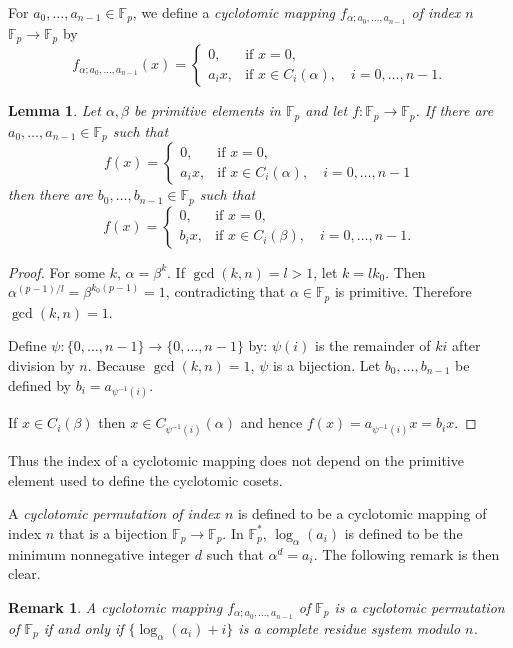 \documentclass[10pt]{amsart}
\newtheorem{remark}[theorem]{Remark}
\newtheorem{lemma}[theorem]{Lemma}
\begin{document}
For $a_0,\ldots,a_{n-1} \in \mathbb{F}_p$, we define a {\em
cyclotomic mapping $f_{\alpha;a_0,\ldots,a_{n-1}}$ of index $n$}
$\mathbb{F}_p \to \mathbb{F}_p$  by
\[
f_{\alpha;a_0,\ldots,a_{n-1}}(x) =
\begin{cases}
0, &\textrm{if } x = 0,\\
a_i x,&\textrm{if } x \in C_i(\alpha), \quad i=0,\ldots,n-1.
\end{cases}
\]

\begin{lemma}
Let $\alpha,\beta$ be primitive elements in $\mathbb{F}_p$ and let
$f: \mathbb{F}_p \to \mathbb{F}_p$.
If there are $a_0,\ldots,a_{n-1} \in \mathbb{F}_p$ such that
\[
f(x)=\begin{cases}
0,&\textrm{if } x=0,\\
a_i x,&\textrm{if } x \in C_i(\alpha),\quad i=0,\ldots,n-1
\end{cases}
\]
then there are $b_0,\ldots,b_{n-1} \in \mathbb{F}_p$ such that
\[
f(x)=\begin{cases}
0,&\textrm{if } x=0,\\
b_i x,&\textrm{if } x \in C_i(\beta),\quad i=0,\ldots,n-1.
\end{cases}
\]
\end{lemma}
\begin{proof}
For some $k$, $\alpha=\beta^k$.
If $\gcd(k,n)=l>1$, let $k=lk_0$.
Then $\alpha^{(p-1)/l}=\beta^{k_0(p-1)}=1$, contradicting that
$\alpha \in \mathbb{F}_p$ is primitive. Therefore $\gcd(k,n)=1$.

Define $\psi:\{0,\ldots,n-1\} \to
\{0,\ldots,n-1\}$ by: $\psi(i)$ is the remainder of $ki$ after division by $n$.
Because $\gcd(k,n)=1$, $\psi$ is a bijection.
Let $b_0,\ldots,b_{n-1}$ be defined by $b_i=a_{\psi^{-1}(i)}$.

If $x \in C_i(\beta)$ then $x \in C_{\psi^{-1}(i)}(\alpha)$ and hence
$f(x)=a_{\psi^{-1}(i)}x=b_i x$.
\end{proof}

Thus the index of a cyclotomic mapping does not depend on the primitive element
used to define the cyclotomic cosets.

A {\em cyclotomic permutation of index $n$} is defined to be a
cyclotomic mapping of index $n$ that is a bijection $\mathbb{F}_p \to
\mathbb{F}_p$.
In
$\mathbb{F}_p^*$, $\log_\alpha(a_i)$ is defined to be the minimum
nonnegative integer $d$ such that $\alpha^d= a_i$.
The following remark is then clear.

\begin{remark}
\label{complete}
A cyclotomic mapping $f_{\alpha;a_0,\ldots,a_{n-1}}$ of $\mathbb{F}_p$
is a cyclotomic permutation of $\mathbb{F}_p$ if and only if
$\{\log_{\alpha}(a_i) + i \}$ is a complete residue system modulo
$n$.
\end{remark}
\end{document}
